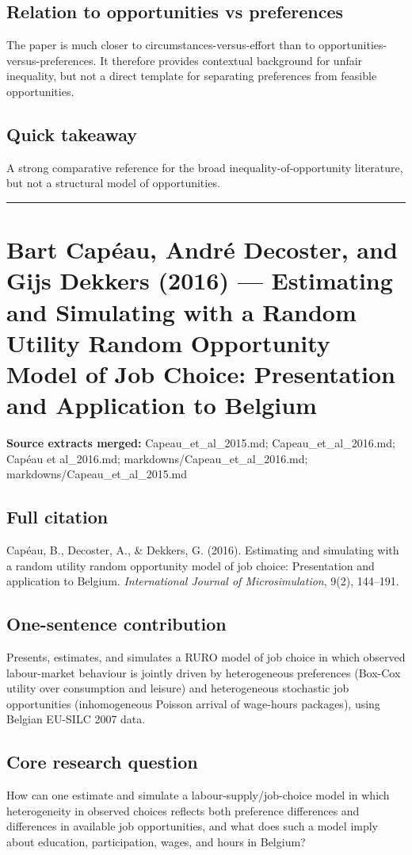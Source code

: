 \documentclass[11pt,a4paper]{article}
\begin{document}
\subsection*{Relation to opportunities vs preferences}
The paper is much closer to circumstances-versus-effort than to opportunities-versus-preferences. It therefore provides contextual background for unfair inequality, but not a direct template for separating preferences from feasible opportunities.

\subsection*{Quick takeaway}
A strong comparative reference for the broad inequality-of-opportunity literature, but not a structural model of opportunities.


\medskip\hrule\medskip

\section*{Bart Capéau, André Decoster, and Gijs Dekkers (2016) — Estimating and Simulating with a Random Utility Random Opportunity Model of Job Choice: Presentation and Application to Belgium}

\textbf{Source extracts merged:} Capeau\_et\_al\_2015.md; Capeau\_et\_al\_2016.md; Capéau et al\_2016.md; markdowns/Capeau\_et\_al\_2016.md; markdowns/Capeau\_et\_al\_2015.md

\subsection*{Full citation}
Capéau, B., Decoster, A., \& Dekkers, G. (2016). Estimating and simulating with a random utility random opportunity model of job choice: Presentation and application to Belgium. \textit{International Journal of Microsimulation}, 9(2), 144--191.

\subsection*{One-sentence contribution}
Presents, estimates, and simulates a RURO model of job choice in which observed labour-market behaviour is jointly driven by heterogeneous preferences (Box-Cox utility over consumption and leisure) and heterogeneous stochastic job opportunities (inhomogeneous Poisson arrival of wage-hours packages), using Belgian EU-SILC 2007 data.

\subsection*{Core research question}
How can one estimate and simulate a labour-supply/job-choice model in which heterogeneity in observed choices reflects both preference differences and differences in available job opportunities, and what does such a model imply about education, participation, wages, and hours in Belgium?
\end{document}
